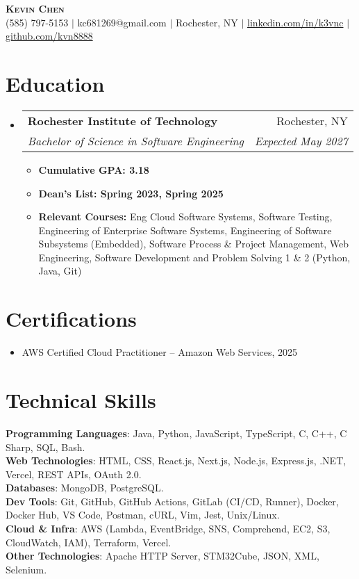 \documentclass[letterpaper,11pt]{article}
\makeatletter
\newcommand{\resumeItem}[1]{
  \item\small{
    {#1 \vspace{-2pt}}
  }
}
\newcommand{\resumeSubheading}[4]{
  \vspace{-2pt}\item
    \begin{tabular*}{0.97\textwidth}[t]{l@{\extracolsep{\fill}}r}
      \textbf{#1} & #2 \\
      \textit{\small#3} & \textit{\small #4} \\
    \end{tabular*}\vspace{-7pt}
}
\newcommand{\resumeSubHeadingListStart}{\begin{itemize}[leftmargin=0.15in, label={}]}
\newcommand{\resumeSubHeadingListEnd}{\end{itemize}}
\newcommand{\resumeItemListStart}{\begin{itemize}}
\newcommand{\resumeItemListEnd}{\end{itemize}\vspace{-5pt}}
\makeatother
\begin{document}
\begin{center}
    \textbf{\Huge \scshape Kevin Chen} \\ \vspace{1pt}
    \small (585) 797-5153 $|$ kc681269@gmail.com $|$ Rochester, NY $|$ 
    \href{https://www.linkedin.com/in/k3vnc/}{linkedin.com/in/k3vnc} $|$ 
    \href{https://github.com/kvn8888}{github.com/kvn8888}
\end{center}

\section{Education}
  \resumeSubHeadingListStart
    \resumeSubheading
      {Rochester Institute of Technology}{Rochester, NY}
      {Bachelor of Science in Software Engineering}{Expected May 2027}
      \resumeItemListStart
        \resumeItem{\textbf{Cumulative GPA: 3.18}}
        \resumeItem{\textbf{Dean's List: Spring 2023, Spring 2025}}
        \resumeItem{\textbf{Relevant Courses:} Eng Cloud Software Systems, Software Testing, Engineering of Enterprise Software Systems, Engineering of Software Subsystems (Embedded), Software Process \& Project Management, Web Engineering, Software Development and Problem Solving 1 \& 2 (Python, Java, Git)}
      \resumeItemListEnd
  \resumeSubHeadingListEnd

\section{Certifications}
  \resumeSubHeadingListStart
    \resumeItem{AWS Certified Cloud Practitioner -- Amazon Web Services, 2025}
  \resumeSubHeadingListEnd

\section{Technical Skills}
\begin{itemize}[leftmargin=0.15in, label={}]
\small{\item{
\textbf{Programming Languages}{: Java, Python, JavaScript, TypeScript, C, C++, C Sharp, SQL, Bash.} \\
\textbf{Web Technologies}{: HTML, CSS, React.js, Next.js, Node.js, Express.js, .NET, Vercel, REST APIs, OAuth 2.0.} \\
\textbf{Databases}{: MongoDB, PostgreSQL.} \\
\textbf{Dev Tools}{: Git, GitHub, GitHub Actions, GitLab (CI/CD, Runner), Docker, Docker Hub, VS Code, Postman, cURL, Vim, Jest, Unix/Linux.} \\
\textbf{Cloud \& Infra}{: AWS (Lambda, EventBridge, SNS, Comprehend, EC2, S3, CloudWatch, IAM), Terraform, Vercel.} \\
\textbf{Other Technologies}{: Apache HTTP Server, STM32Cube, JSON, XML, Selenium.}}}\\
\end{itemize}
\end{document}

